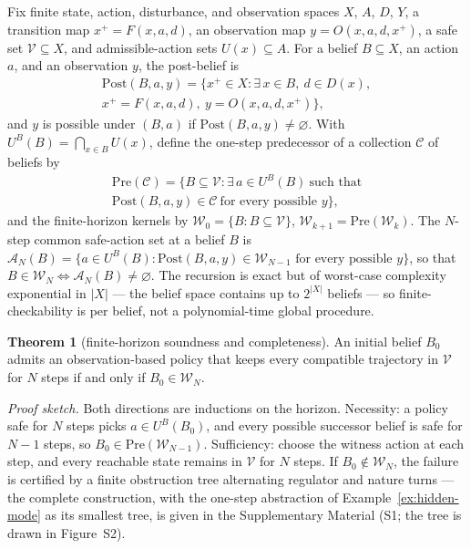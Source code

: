 \documentclass[10pt,twocolumn]{article}
\theoremstyle{definition}
\newtheorem{theorem}{Theorem}
\begin{document}
Fix finite state, action, disturbance, and observation spaces \(X\),
\(A\), \(D\), \(Y\), a transition map \(x^+ = F(x,a,d)\), an observation
map \(y = O(x,a,d,x^+)\), a safe set \(\mathcal V\subseteq X\), and
admissible-action sets \(U(x)\subseteq A\). For a belief \(B\subseteq X\),
an action \(a\), and an observation \(y\), the post-belief is
\[
\begin{gathered}
\mathrm{Post}(B,a,y) = \bigl\{ x^+\in X : \exists\, x\in B,\ d\in D(x), \\
x^+ = F(x,a,d),\ y = O(x,a,d,x^+) \bigr\},
\end{gathered}
\]
and \(y\) is possible under \((B,a)\) if \(\mathrm{Post}(B,a,y)\neq\varnothing\).
With \(U^B(B)=\bigcap_{x\in B}U(x)\), define the one-step predecessor of a
collection \(\mathcal C\) of beliefs by
\[
\begin{gathered}
\mathrm{Pre}(\mathcal C) = \bigl\{ B\subseteq\mathcal V : \exists\, a\in U^B(B)\ \text{such that}\\
\mathrm{Post}(B,a,y)\in\mathcal C\ \text{for every possible } y \bigr\},
\end{gathered}
\]
and the finite-horizon kernels by \(\mathcal W_0 = \{B : B\subseteq\mathcal V\}\),
\(\mathcal W_{k+1} = \mathrm{Pre}(\mathcal W_k)\).
The \(N\)-step common safe-action set at a belief \(B\) is
\(\mathcal{A}_N(B) = \bigl\{ a \in U^B(B) : \mathrm{Post}(B,a,y) \in \mathcal W_{N-1} \text{ for every possible } y \bigr\}\),
so that \(B \in \mathcal W_N \iff \mathcal{A}_N(B) \neq \varnothing\). The recursion is exact but of worst-case complexity exponential in
\(|X|\) --- the belief space contains up to \(2^{|X|}\) beliefs --- so
finite-checkability is per belief, not a polynomial-time global procedure.

\begin{theorem}[finite-horizon soundness and completeness]\label{thm:finite-horizon}
An initial belief \(B_0\) admits an observation-based policy that keeps
every compatible trajectory in \(\mathcal V\) for \(N\) steps if and only
if \(B_0\in\mathcal W_N\).
\end{theorem}

\emph{Proof sketch.} Both directions are inductions on the horizon. Necessity: a policy safe for \(N\) steps picks \(a \in U^B(B_0)\), and every possible successor belief is safe for \(N - 1\) steps, so \(B_0 \in \mathrm{Pre}(\mathcal{W}_{N-1})\). Sufficiency: choose the witness action at each step, and every reachable state remains in \(\mathcal{V}\) for \(N\) steps. If \(B_0 \notin \mathcal{W}_N\), the failure is certified by a finite obstruction tree alternating regulator and nature turns --- the complete construction, with the one-step abstraction of Example~\ref{ex:hidden-mode} as its smallest tree, is given in the Supplementary Material (S1; the tree is drawn in Figure~S2).
\end{document}
